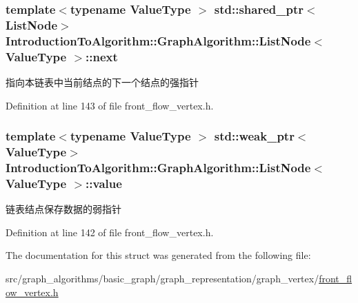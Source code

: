 \subsubsection[{next}]{\setlength{\rightskip}{0pt plus 5cm}template$<$typename Value\+Type $>$ std\+::shared\+\_\+ptr$<${\bf List\+Node}$>$ {\bf Introduction\+To\+Algorithm\+::\+Graph\+Algorithm\+::\+List\+Node}$<$ Value\+Type $>$\+::next}\label{struct_introduction_to_algorithm_1_1_graph_algorithm_1_1_list_node_a78e88960b96014607258bf721c2023d1}
指向本链表中当前结点的下一个结点的强指针 

Definition at line 143 of file front\+\_\+flow\+\_\+vertex.\+h.

\hypertarget{struct_introduction_to_algorithm_1_1_graph_algorithm_1_1_list_node_a77c644bba4a2996906d1d5b5be300b00}{}
\subsubsection[{value}]{\setlength{\rightskip}{0pt plus 5cm}template$<$typename Value\+Type $>$ std\+::weak\+\_\+ptr$<$Value\+Type$>$ {\bf Introduction\+To\+Algorithm\+::\+Graph\+Algorithm\+::\+List\+Node}$<$ Value\+Type $>$\+::value}\label{struct_introduction_to_algorithm_1_1_graph_algorithm_1_1_list_node_a77c644bba4a2996906d1d5b5be300b00}
链表结点保存数据的弱指针 

Definition at line 142 of file front\+\_\+flow\+\_\+vertex.\+h.



The documentation for this struct was generated from the following file\+:\begin{DoxyCompactItemize}
\item 
src/graph\+\_\+algorithms/basic\+\_\+graph/graph\+\_\+representation/graph\+\_\+vertex/\hyperlink{front__flow__vertex_8h}{front\+\_\+flow\+\_\+vertex.\+h}\end{DoxyCompactItemize}
